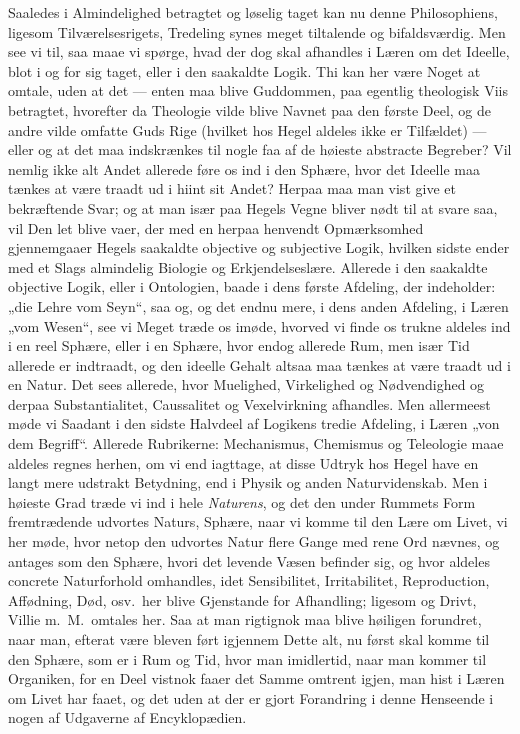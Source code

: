 \documentclass[12pt,a4paper]{book}
\newcommand{\apage}[1]{\marginnote{\footnotesize\textit{[#1]}}}
\begin{document}
Saaledes i Almindelighed betragtet og løselig taget kan nu denne
Philosophiens, ligesom Tilværelsesrigets, Tredeling synes meget
tiltalende og bifaldsværdig. Men see vi til, saa maae vi spørge, hvad
der dog skal afhandles i Læren om det Ideelle, blot i og for sig taget,
eller i den saakaldte Logik. Thi kan her være Noget at omtale, uden at
det --- enten maa blive Guddommen, paa egentlig theologisk Viis
betragtet, hvorefter da Theologie vilde blive Navnet paa den første
Deel, og de andre vilde omfatte Guds Rige (hvilket hos Hegel aldeles
ikke er Tilfældet) --- eller og at det maa indskrænkes til nogle faa af
de høieste abstracte Begreber? Vil nemlig ikke alt Andet allerede føre
os ind i den Sphære, hvor det Ideelle maa tænkes at være traadt ud i
hiint sit Andet? Herpaa maa man vist give et bekræftende Svar; og at
man især paa Hegels Vegne bliver nødt til at svare saa, vil Den let
blive vaer, der med en herpaa henvendt Opmærksomhed gjennemgaaer Hegels
saakaldte objective og subjective Logik, hvilken sidste ender med et
Slags almindelig Biologie og Erkjendelseslære. Allerede i den saakaldte
objective Logik, eller i Ontologien, baade i dens første Afdeling, der
indeholder: „die Lehre vom Seyn“, saa og, og det endnu mere, i dens
anden Afdeling, i Læren „vom Wesen“, see vi Meget træde os imøde,
hvorved vi finde os trukne aldeles ind i en reel Sphære, eller i en
Sphære, hvor endog allerede Rum, men især Tid allerede er indtraadt, og
den ideelle Gehalt altsaa maa tænkes at være traadt ud i en Natur. Det
sees allerede, hvor Muelighed, Virkelighed og Nødvendighed og derpaa
Substantialitet, Caussalitet og Vexelvirkning afhandles. Men allermeest
møde vi Saadant i den sidste Halvdeel af Logikens tredie Afdeling, i
Læren „von dem Begriff“. Allerede Rubrikerne: Mechanismus, Chemismus og
Teleologie maae aldeles regnes herhen, om vi end iagttage, at disse
Udtryk hos Hegel have
\apage{73} en langt mere udstrakt Betydning, end i Physik og anden Naturvidenskab.
Men i høieste Grad træde vi ind i hele \emph{Naturens}, og det den under Rummets
Form fremtrædende udvortes Naturs, Sphære, naar vi komme til den Lære om
Livet, vi her møde, hvor netop den udvortes Natur flere Gange med rene Ord
nævnes, og antages som den Sphære, hvori det levende Væsen befinder sig, og
hvor aldeles concrete Naturforhold omhandles, idet Sensibilitet,
Irritabilitet, Reproduction, Affødning, Død, osv.\ her blive
Gjenstande for Afhandling; ligesom og Drivt, Villie m.\ M.\ omtales her.
Saa at man rigtignok maa blive høiligen forundret, naar man, efterat være
bleven ført igjennem Dette alt, nu først skal komme til den Sphære, som er
i Rum og Tid, hvor man imidlertid, naar man kommer til Organiken, for en
Deel vistnok faaer det Samme omtrent igjen, man hist i Læren om Livet har
faaet, og det uden at der er gjort Forandring i denne Henseende i nogen af
Udgaverne af Encyklopædien.
\end{document}

